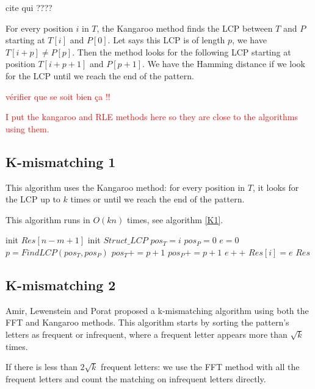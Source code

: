\documentclass[preprint,12pt]{elsarticle}
\begin{document}
cite qui ????

For every position $i$ in $T$, the Kangaroo method finds the LCP between $T$ and $P$
starting at $T[i]$ and $P[0]$.
Let says this LCP is of length $p$, we have $T[i+p] \neq P[p]$.
Then the method looks for the following LCP starting at position $T[i+p+1]$ and $P[p+1]$.
We have the Hamming distance if we look for the LCP until we reach the end of the pattern.

\textcolor{red}{vérifier que se soit bien ça !!}

\textcolor{red}{I put the kangaroo and RLE methods here so they are close to the algorithms using them.}


\subsection{K-mismatching 1}

This algorithm\cite{Kangaroo} uses the Kangaroo method:
for every position in $T$, it looks for the LCP up to $k$ times or until we reach the end of the pattern.

This algorithm runs in $O(kn)$ times, see algorithm \ref{K1}.



\begin{algorithm}
\label{K1}
\caption{$K\_mism\_1(T, P, k)$}
\begin{algorithmic}

\STATE init $Res[n-m+1]$
\STATE init $Struct\_LCP$
	\STATE $pos_T = i$
	\STATE $pos_P = 0$
	\STATE $e=0$
		\STATE $p = FindLCP(pos_T, pos_P)$
		\STATE $pos_T += p + 1$
		\STATE $pos_P += p +1$
		\STATE $e++$
		\ENDWHILE
	\STATE $Res[i] = e$
\ENDFOR
\RETURN $Res$

\end{algorithmic}
\end{algorithm}


\subsection{K-mismatching 2}
Amir, Lewenstein and Porat\cite{Kmism2} proposed a k-mismatching algorithm
using both the FFT and Kangaroo methods.
This algorithm starts by sorting the pattern's letters as frequent or infrequent,
where a frequent letter appears more than $\sqrt{k}$ times.

If there is less than $2\sqrt{k}$ frequent letters: 
we use the FFT method with all the frequent letters and count the matching on infrequent letters directly.
\end{document}
